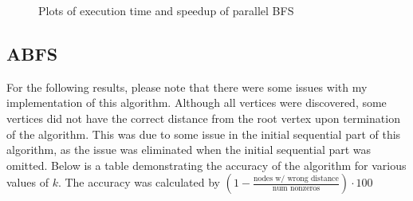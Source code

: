 \documentclass{article}
\begin{document}
\begin{figure}[H]
\begin{minipage}{0.45\textwidth}
        \end{minipage}
        \caption{Plots of execution time and speedup of parallel BFS}
    \end{figure}

    \subsection{ABFS}

    For the following results, please note that there were some issues with my implementation of this algorithm. Although all vertices were discovered, some vertices did not have the correct distance from the root vertex upon termination of the algorithm. This was due to some issue in the initial sequential part of this algorithm, as the issue was eliminated when the initial sequential part was omitted. Below is a table demonstrating the accuracy of the algorithm for various values of \( k \). The accuracy was calculated by \( \left( 1 - \frac{\text{nodes w/ wrong distance}}{\text{num nonzeros}} \right) \cdot  100 \)
    \medskip
\end{document}
